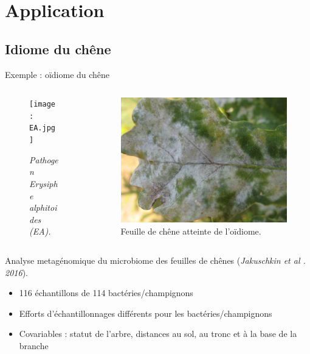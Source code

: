 \documentclass[11pt]{beamer}
\begin{document}
\section{Application}
\subsection{Idiome du chêne}


\begin{frame}{Exemple : oïdiome du chêne}
\begin{columns}
\begin{column}{5cm}
\begin{figure}[htp]
\centering
\texttt{[image: EA.jpg]}
\caption{\textit{Pathogen Erysiphe alphitoides (EA).}}
\end{figure}
\end{column}
\begin{column}{6cm}
\begin{figure}[htp]
\centering
\includegraphics[scale=0.1]{mildew.jpg}
\caption{Feuille de chêne atteinte de l'oïdiome.}
\end{figure}
\end{column}
\end{columns}
\vspace{0.5cm}
Analyse metagénomique du microbiome des feuilles de chênes (\textit{Jakuschkin et al . 2016}).\\

\begin{itemize}
	\item 116 échantillons de 114 bactéries/champignons
	\item Efforts d'échantillonnages différents pour les bactéries/champignons
	\item Covariables : statut de l'arbre, distances au sol, au tronc et à la base de la branche
\end{itemize}
\end{frame}
\end{document}

